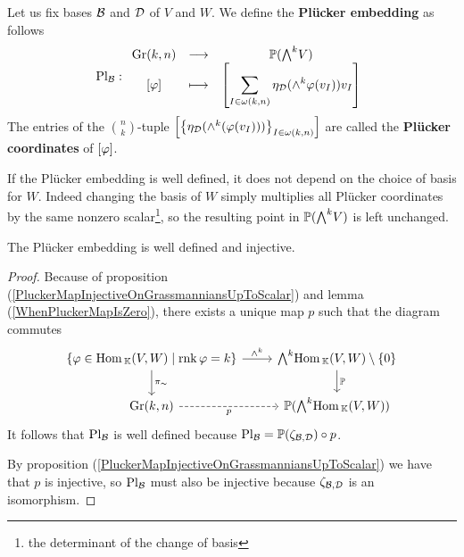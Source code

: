 \begin{definition}
Let us fix bases $\mathcal{B}$ and $\mathcal{D}$ of $V$ and $W$. We define the \textbf{Pl\"ucker embedding} as follows
\[\Pl_\Bc:\funcDef{\Gr(k,n)}{\Pj(\bw V)}{[\vp]}{\displaystyle\spa{\sum_{I\in \omega(k,n)} \eta_\Dc(\wedge^k\vp(v_I))v_I}}\]
The entries of the $\binom nk$-tuple $\left[{\left\{{\eta_{\mathcal{D}}(\wedge^k(\varphi(v_I)))}\right\}_{I\in\omega(k,n)}}\right]$ are called the \textbf{Pl\"ucker coordinates} of $[\varphi]$. 
\end{definition}
\begin{remark}
If the Pl\"ucker embedding is well defined, it does not depend on the choice of basis for $W$. Indeed changing the basis of $W$ simply multiplies all Pl\"ucker coordinates by the same nonzero scalar\footnote{the determinant of the change of basis}, so the resulting point in $\Pj(\bw V)$ is left unchanged.
\end{remark}

\begin{proposition}\label{PluckerEmbeddingWellDefinedInjective}
The Pl\"ucker embedding is well defined and injective.
\end{proposition}
\begin{proof}
Because of proposition (\ref{PluckerMapInjectiveOnGrassmanniansUpToScalar}) and lemma (\ref{WhenPluckerMapIsZero}), there exists a unique map $p$ such that the diagram commutes
\[\begin{tikzcd}
	{\cpa{\vp\in \Hom_\K(V,W)\mid \rnk \vp=k}} & {\bw \Hom_\K(V,W)\nz} \\
	{\Gr(k,n)} & {\Pj(\bw \Hom_\K(V,W))}
	\arrow["{\wedge^k}", from=1-1, to=1-2]
	\arrow["{\pi_\sim}", from=1-1, to=2-1]
	\arrow["\Pj", from=1-2, to=2-2]
	\arrow["p"', dashed, from=2-1, to=2-2]
\end{tikzcd}\]
It follows that $\mathrm{Pl}_{\mathcal{B}}$ is well defined because $\mathrm{Pl}_{\mathcal{B}}=\mathbb{P}(\zeta_{\mathcal{B},\mathcal{D}})\circ p$.

By proposition (\ref{PluckerMapInjectiveOnGrassmanniansUpToScalar}) we have that $p$ is injective, so $\mathrm{Pl}_{\mathcal{B}}$ must also be injective because $\zeta_{\mathcal{B},\mathcal{D}}$ is an isomorphism.
\end{proof}


